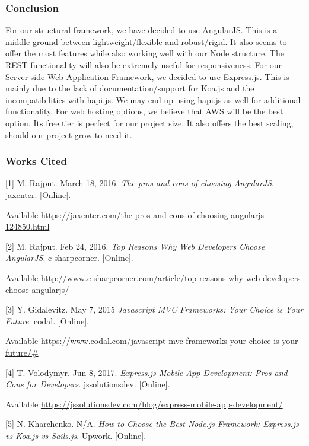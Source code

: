 			
\subsubsection{Conclusion}

For our structural framework, we have decided to use AngularJS. This is a middle ground between lightweight/flexible and robust/rigid. It also seems to offer the most features while also working well with our Node structure. The REST functionality will also be extremely useful for responsiveness. For our Server-side Web Application Framework, we decided to use Express.js. This is mainly due to the lack of documentation/support for Koa.js and the incompatibilities with hapi.js. We may end up using hapi.js as well for additional functionality. For web hosting options, we believe that AWS will be the best option. Its free tier is perfect for our project size. It also offers the best scaling, should our project grow to need it.

\pagebreak
	
\subsubsection{Works Cited} 



[1] M. Rajput. March 18, 2016. \textit{The pros and cons of choosing AngularJS}. jaxenter. [Online]. 

Available \url{https://jaxenter.com/the-pros-and-cons-of-choosing-angularjs-124850.html}

[2] M. Rajput. Feb 24, 2016. \textit{Top Reasons Why Web Developers Choose AngularJS}. c-sharpcorner. [Online]. 

Available \url{http://www.c-sharpcorner.com/article/top-reasons-why-web-developers-choose-angularjs/}

[3] Y. Gidalevitz. May 7, 2015 \textit{Javascript MVC Frameworks: Your Choice is Your Future}. codal. [Online].  

Available \url{https://www.codal.com/javascript-mvc-frameworks-your-choice-is-your-future/#}

[4] T. Volodymyr. Jun 8, 2017. \textit{Express.js Mobile App Development: Pros and Cons for Developers}. jssolutionsdev. [Online].  

Available \url{https://jssolutionsdev.com/blog/express-mobile-app-development/}

[5] N. Kharchenko. N/A. \textit{How to Choose the Best Node.js Framework: Express.js vs Koa.js vs Sails.js}. Upwork. [Online]. 

